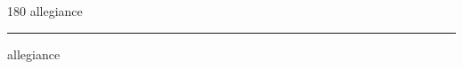 
\begin{frame}
\begin{center}
\begin{turn}{180}
{\fontsize{2.5cm}{1em}\selectfont allegiance}
\end{turn}
\vspace{1em}\par  
\hrule
\vspace{1em}\par  
{\fontsize{2.5cm}{1em}\selectfont allegiance}
\end{center}
\end{frame}
